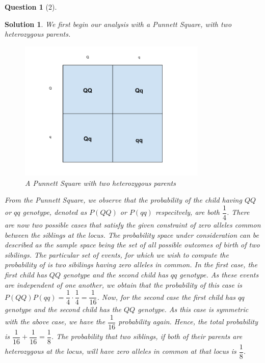 \documentclass{article} %
\theoremstyle{quest}
\newtheorem*{question}{Question}
\newtheorem*{solution}{Solution}
\begin{document}
\begin{question}[2]
\end{question}
\begin{solution}
We first begin our analysis with a Punnett Square, with two heterozygous parents. \\

\begin{figure}[h!]
  \caption{A Punnett Square with two heterozygous parents}
  \centering
    \includegraphics[width=0.8\textwidth]{PunnettII.pdf}
\end{figure}

From the Punnett Square, we observe that the probability of the child having $QQ$ or $qq$ genotype, 
denoted as $P(QQ)$ or $P(qq)$ respecitvely, are both $\dfrac{1}{4}$. There are now two possible cases
that satisfy the given constraint of zero alleles common between the siblings at the locus.
The probability space under consideration can be described as the sample space being
the set of all possible outcomes of birth of two sibilings. The particular set of events, for which 
we wish to compute the probability of is two sibilings having zero alleles in common.
In the first case, the first child has $QQ$ genotype and the second child has $qq$ genotype. As
these events are independent of one another, we obtain that the probability of this case is
$P(QQ)P(qq) = \dfrac{1}{4} \cdot \dfrac{1}{4} = \dfrac{1}{16}$. Now, for the second case the first child 
has $qq$ genotype and the second child has the $QQ$ genotype. As this case is symmetric with the above case,
we have the $\dfrac{1}{16}$ probability again. Hence, the total probability is $\dfrac{1}{16} + 
\dfrac{1}{16} = \dfrac{1}{8}$.
The probability that two siblings, if both of their parents are heterozygous at the locus, will
have zero alleles in common at that locus is $\dfrac{1}{8}$.
\end{solution}
\end{document}
